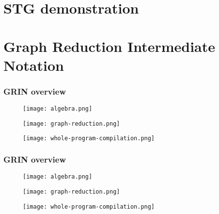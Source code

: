 \documentclass[bigger,aspectratio=169]{beamer}
\begin{document}
\section{STG demonstration}

\section{Graph Reduction Intermediate Notation}

\begin{frame}[fragile]
\frametitle{GRIN overview}
\begin{center}

	\begin{minipage}{0.30\textwidth}
		\begin{figure}
			\texttt{[image: algebra.png]}
		\end{figure}
	\end{minipage}
	\hfill
	\pause
	\begin{minipage}{0.30\textwidth}
		\begin{figure}
			\texttt{[image: graph-reduction.png]}
		\end{figure}
	\end{minipage}
	\hfill
	\pause
	\begin{minipage}{0.30\textwidth}
		\begin{figure}
			\texttt{[image: whole-program-compilation.png]}
		\end{figure}
	\end{minipage}

\end{center}
\end{frame}

\begin{frame}[fragile]
\frametitle{GRIN overview}
\begin{center}

	\begin{minipage}{0.30\textwidth}
		\begin{figure}
			\texttt{[image: algebra.png]}
		\end{figure}
	\end{minipage}
	\hfill
	\begin{minipage}{0.30\textwidth}
		\begin{figure}
			\texttt{[image: graph-reduction.png]}
		\end{figure}
	\end{minipage}
	\hfill
	\begin{minipage}{0.30\textwidth}
		\begin{figure}
			\texttt{[image: whole-program-compilation.png]}
		\end{figure}
	\end{minipage}

\end{center}
\end{frame}
\end{document}
